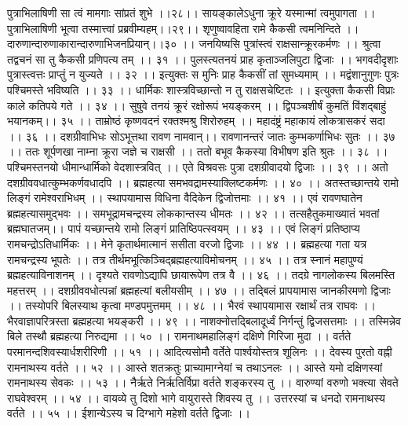 पुत्राभिलाषिणी सा त्वं मामगाः सांप्रतं शुभे ।।२८।।
सायङ्कालेऽधुना क्रूरे यस्मान्मां त्वमुपागता ।।
पुत्राभिलाषिणी भूत्वा तस्मात्त्वां प्रब्रवीम्यहम्।।२९।।
शृणुष्वावहिता रामे कैकसी त्वमनिन्दिते ।।
दारुणान्दारुणाकारान्दारुणाभिजनप्रियान्।।३० ।।
जनयिष्यसि पुत्रांस्त्वं राक्षसान्क्रूरकर्मणः ।।
श्रुत्वा तद्वचनं सा तु कैकसी प्रणिपत्य तम् ।। ३१ ।।
पुलस्त्यतनयं प्राह कृताञ्जलिपुटा द्विजाः ।।
भगवदीदृशाः पुत्रास्त्वत्तः प्राप्तुं न युज्यते ।। ३२ ।।
इत्युक्तः स मुनिः प्राह कैकसीं तां सुमध्यमाम् ।।
मद्वंशानुगुणः पुत्रः पश्चिमस्ते भविष्यति ।। ३३ ।।
धार्मिकः शास्त्रविच्छान्तो न तु राक्षसचेष्टितः ।।
इत्युक्ता कैकसी विप्राः काले कतिपये गते ।। ३४ ।।
सुषुवे तनयं क्रूरं रक्षोरूपं भयङ्करम् ।।
द्विपञ्चशीर्षं कुमतिं विंशद्बाहुं भयानकम्।। ३५ ।।
ताम्रोष्ठं कृष्णवदनं रक्तश्मश्रु शिरोरुहम् ।।
महादंष्ट्रं महाकायं लोकत्रासकरं सदा ।। ३६ ।।
दशग्रीवाभिधः सोऽभूत्तथा रावण नामवान्।।
रावणानन्तरं जातः कुम्भकर्णाभिधः सुतः ।। ३७ ।।
ततः शूर्पणखा नाम्ना क्रूरा जज्ञे च राक्षसी ।।
ततो बभूव कैकस्या विभीषण इति श्रुतः ।। ३८ ।।
पश्चिमस्तनयो धीमान्धार्मिको वेदशास्त्रवित् ।।
एते विश्रवसः पुत्रा दशग्रीवादयो द्विजाः ।। ३९ ।।
अतो दशग्रीववधात्कुम्भकर्णवधादपि ।।
ब्रह्महत्या समभवद्रामस्याक्लिष्टकर्मणः ।। ४० ।।
अतस्तच्छान्तये रामो लिङ्गं रामेश्वराभिधम् ।।
स्थापयामास विधिना वैदिकेन द्विजोत्तमाः ।। ४१ ।।
एवं रावणघातेन ब्रह्महत्यासमुद्भवः ।।
समभूद्रामचन्द्रस्य लोककान्तस्य धीमतः ।। ४२ ।।
तत्सहैतुकमाख्यातं भवतां ब्रह्मघातजम्।।
पापं यच्छान्तये रामो लिङ्गं प्रातिष्ठिपत्स्वयम् ।। ४३ ।।
एवं लिङ्गं प्रतिष्ठाप्य रामचन्द्रोऽतिधार्मिकः ।।
मेने कृतार्थमात्मानं ससीता वरजो द्विजाः ।। ४४ ।।
ब्रह्महत्या गता यत्र रामचन्द्रस्य भूपतेः ।।
तत्र तीर्थमभूत्किञ्चिद्ब्रह्महत्याविमोचनम् ।। ४५ ।।
तत्र स्नानं महापुण्यं ब्रह्महत्याविनाशनम् ।।
दृश्यते रावणोऽद्यापि छायारूपेण तत्र वै ।। ४६ ।।
तदग्रे नागलोकस्य बिलमस्ति महत्तरम् ।।
दशग्रीववधोत्पन्नां ब्रह्महत्यां बलीयसीम् ।। ४७ ।।
तद्बिलं प्रापयामास जानकीरमणो द्विजाः ।।
तस्योपरि बिलस्याथ कृत्वा मण्डपमुत्तमम् ।। ४८ ।।
भैरवं स्थापयामास रक्षार्थं तत्र राघवः ।।
भैरवाज्ञापरित्रस्ता ब्रह्महत्या भयङ्करी ।। ४९ ।।
नाशक्नोत्तद्बिलादूर्ध्वं निर्गन्तुं द्विजसत्तमाः ।।
तस्मिन्नेव बिले तस्थौ ब्रह्महत्या निरुद्यमा ।। ५० ।।
रामनाथमहालिङ्गं दक्षिणे गिरिजा मुदा ।।
वर्तते परमानन्दशिवस्यार्धशरीरिणी ।। ५१ ।।
आदित्यसोमौ वर्तेते पार्श्वयोस्तत्र शूलिनः ।।
देवस्य पुरतो वह्नी रामनाथस्य वर्तते ।। ५२ ।।
आस्ते शतक्रतुः प्राच्यामाग्नेयां च तथाऽनलः ।।
आस्ते यमो दक्षिणस्यां रामनाथस्य सेवकः ।। ५३ ।।
नैर्ऋते निर्ऋतिर्विप्रा वर्तते शङ्करस्य तु ।।
वारुण्यां वरुणो भक्त्या सेवते राघवेश्वरम् ।। ५४ ।।
वायव्ये तु दिशो भागे वायुरास्ते शिवस्य तु ।।
उत्तरस्यां च धनदो रामनाथस्य वर्तते ।। ५५ ।।
ईशान्येऽस्य च दिग्भागे महेशो वर्तते द्विजाः ।।
